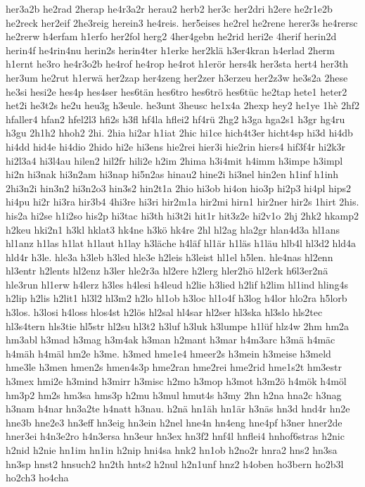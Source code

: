 {her3a2b
he2rad
2herap
he4r3a2r
herau2
herb2
her3c
her2dri
h2ere
he2r1e2b
he2reck
her2eif
2he3reig
herein3
he4reis.
her5eises
he2rel
he2rene
herer3s
he4rersc
he2rerw
h4erfam
h1erfo
her2fol
herg2
4her4gebn
he2rid
heri2e
4herif
herin2d
herin4f
he4rin4nu
herin2s
herin4ter
h1erke
her2klä
h3er4kran
h4erlad
2herm
h1ernt
he3ro
he4r3o2b
he4rof
he4rop
he4rot
h1erör
hers4k
her3sta
hert4
her3th
her3um
he2rut
h1erwä
her2zap
her4zeng
her2zer
h3erzeu
her2z3w
he3s2a
2hese
he3si
hesi2e
hes4p
hes4ser
hes6tän
hes6tro
hes6trö
hes6tüc
he2tap
hete1
heter2
het2i
he3t2s
he2u
heu3g
h3eule.
he3unt
3heusc
he1x4a
2hexp
hey2
he1ye
1hè
2hf2
hfaller4
hfan2
hfel2l3
hfi2s
h3fl
hf4la
hflei2
hf4rü
2hg2
h3ga
hga2s1
h3gr
hg4ru
h3gu
2h1h2
hhoh2
2hi.
2hia
hi2ar
h1iat
2hic
hi1ce
hich4t3er
hicht4sp
hi3d
hi4db
hi4dd
hid4e
hi4dio
2hido
hi2e
hi3ens
hie2rei
hier3i
hie2rin
hiers4
hif3f4r
hi2k3r
hi2l3a4
hi3l4au
hilen2
hil2fr
hili2e
h2im
2hima
h3i4mit
h4imm
h3impe
h3impl
hi2n
hi3nak
hi3n2am
hi3nap
hi5n2as
hinau2
hine2i
hi3nel
hin2en
h1inf
h1inh
2hi3n2i
hin3n2
hi3n2o3
hin3s2
hin2t1a
2hio
hi3ob
hi4on
hio3p
hi2p3
hi4pl
hips2
hi4pu
hi2r
hi3ra
hir3b4
4hi3re
hi3ri
hir2m1a
hir2mi
hirn1
hir2ner
hir2s
1hirt
2his.
his2a
hi2se
h1i2so
his2p
hi3tac
hi3th
hi3t2i
hit1r
hit3z2e
hi2v1o
2hj
2hk2
hkamp2
h2keu
hki2n1
h3kl
hklat3
hk4ne
h3kö
hk4re
2hl
hl2ag
hla2gr
hlan4d3a
hl1ans
hl1anz
h1las
h1lat
h1laut
h1lay
h3läche
h4läf
hl1är
h1läs
h1läu
hlb4l
hl3d2
hld4a
hld4r
h3le.
hle3a
h3leb
h3led
hle3e
h2leis
h3leist
hl1el
h5len.
hle4nas
hl2enn
hl3entr
h2lents
hl2enz
h3ler
hle2r3a
hl2ere
h2lerg
hler2hö
hl2erk
h6l3er2nä
hle3run
hl1erw
h4lerz
h3les
h4lesi
h4leud
h2lie
h3lied
h2lif
h2lim
hl1ind
hling4s
h2lip
h2lis
h2lit1
hl3l2
hl3m2
h2lo
hl1ob
h3loc
hl1o4f
h3log
h4lor
hlo2ra
h5lorb
h3los.
h3losi
h4loss
hlos4st
h2lös
hl2sal
hl4sar
hl2ser
hl3ska
hl3slo
hls2tec
hl3s4tern
hls3tie
hl5str
hl2su
hl3t2
h3luf
h3luk
h3lumpe
h1lüf
hlz4w
2hm
hm2a
hm3abl
h3mad
h3mag
h3m4ak
h3man
h2mant
h3mar
h4m3arc
h3mä
h4mäc
h4mäh
h4mäl
hm2e
h3me.
h3med
hme1e4
hmeer2s
h3mein
h3meise
h3meld
hme3le
h3men
hmen2s
hmen4s3p
hme2ran
hme2rei
hme2rid
hme1s2t
hm3estr
h3mex
hmi2e
h3mind
h3mirr
h3misc
h2mo
h3mop
h3mot
h3m2ö
h4mök
h4möl
hm3p2
hm2s
hm3sa
hms3p
h2mu
h3mul
hmut4s
h3my
2hn
h2na
hna2c
h3nag
h3nam
h4nar
hn3a2te
h4natt
h3nau.
h2nä
hn1äh
hn1är
h3näs
hn3d
hnd4r
hn2e
hne3b
hne2e3
hn3eff
hn3eig
hn3ein
h2nel
hne4n
hn4eng
hne4pf
h3ner
hner2de
hner3ei
h4n3e2ro
h4n3ersa
hn3eur
hn3ex
hn3f2
hnf4l
hnflei4
hnhof6stras
h2nic
h2nid
h2nie
hn1im
hn1in
h2nip
hni4sa
hnk2
hn1ob
h2no2r
hnra2
hns2
hn3sa
hn3sp
hnst2
hnsuch2
hn2th
hnts2
h2nul
h2n1unf
hnz2
h4oben
ho3bern
ho2b3l
ho2ch3
ho4cha
}
